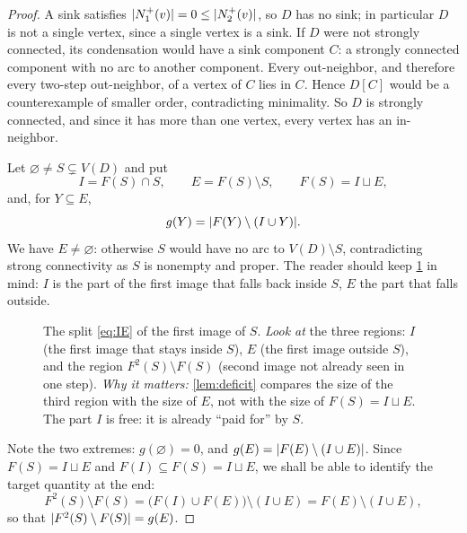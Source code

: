 \begin{proof}
A sink satisfies $\lvert N_1^+(v)\rvert=0\le\lvert N_2^+(v)\rvert$, so $D$ has no sink; in particular $D$ is not
a single vertex, since a single vertex is a sink. If $D$ were not strongly connected, its
condensation would have a sink component $C$: a strongly connected component with no arc to
another component. Every out-neighbor, and therefore every two-step out-neighbor, of a vertex of
$C$ lies in $C$. Hence $D[C]$ would be a counterexample of smaller order, contradicting minimality.
So $D$ is strongly connected, and since it has more than one vertex, every vertex has an
in-neighbor.

Let $\varnothing\ne S\subsetneq V(D)$ and put
\begin{equation}\label{eq:IE}
 I=F(S)\cap S,\qquad E=F(S)\setminus S,\qquad F(S)=I\sqcup E,
\end{equation}
and, for $Y\subseteq E$,
\begin{equation}\label{eq:gdef}
 g(Y)=\lvert F(Y)\setminus(I\cup Y)\rvert .
\end{equation}
We have $E\ne\varnothing$: otherwise $S$ would have no arc to $V(D)\setminus S$, contradicting
strong connectivity as $S$ is nonempty and proper. The reader should keep \cref{fig:deficit} in
mind: $I$ is the part of the first image that falls back inside $S$, $E$ the part that falls
outside.

\begin{figure}[t]
\centering

\caption{The split \eqref{eq:IE} of the first image of $S$. \emph{Look at} the three regions: $I$
 (the first image that stays inside $S$), $E$ (the first image outside $S$), and the region
 $F^2(S)\setminus F(S)$ (second image not already seen in one step). \emph{Why it matters:}
 \cref{lem:deficit} compares the size of the third region with the size of $E$, not with the size
 of $F(S)=I\sqcup E$. The part $I$ is free: it is already ``paid for'' by $S$.}
\label{fig:deficit}
\end{figure}

Note the two extremes: $g(\varnothing)=0$, and $g(E)=\lvert F(E)\setminus(I\cup E)\rvert$. Since
$F(S)=I\sqcup E$ and $F(I)\subseteq F(S)=I\sqcup E$, we shall be able to identify the target
quantity at the end:
\begin{equation}\label{eq:deficit-via-g}
 F^2(S)\setminus F(S)
 =\bigl(F(I)\cup F(E)\bigr)\setminus(I\cup E)
 =F(E)\setminus(I\cup E),
\end{equation}
so that $\lvert F^2(S)\setminus F(S)\rvert=g(E)$.


\end{proof}
